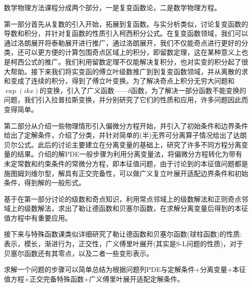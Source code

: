 数学物理方法课程分成两个部分，一是复变函数论，二是数学物理方程。
\setlength{\parindent}{2em}

第一部分首先从复数的引入开始，拓展到复函数。与实分析类似，讨论复变函数的导数和积分，并针对复函数的性质引入柯西积分公式。​在复变函数领域，我们可以通过洛朗展开将泰勒展开进行推广，通过洛朗展开，我们不仅能奇点进行更好的分类，还可以更方便的计算包围奇点区域上的积分，即留数定理，这在某种意义上也是柯西公式的推广。我们利用留数定理不仅能解决复积分，也对实变的积分起了很大帮助。接下来我们将实变函的傅立叶级数推广到到复变函数领域，并从离散的求和变成了连续的积分，得到了傅立叶变换。为了解决奇点上积分无穷大问题和$\exp(ikx)$的变换，引入了广义函数——$\delta$函数，为了解决一部分函数不能变换的问题，我们引入拉普拉斯变换，并分别研究了它们的性质和应用，许多问题因此而变得简单。

第二部分从介绍一些物理情形引入偏微分方程开始，并引入了初始条件和边界条件给出了定解条件，介绍了分类，并针对简单的(半)无界可分离算子情况给出了达朗贝尔公式。此后的讨论主要建立在分离变量的基础上，研究了许多不同方程分离变量的结果。介绍的解PDE一般步骤为利用分离变量法，将偏微分方程转化为带有未定常数和约束条件的常微分方程，即本征值问题，由于讨论到的本征值问题都是施图姆刘维尔型，解具有正交完备性，可以做广义复立叶展开适配边界条件和初始条件，得到解的一般形式。

基于在第一部分讨论的级数和奇点知识，利用常点邻域上的级数解法和正则奇点邻域上的级数解法，求出了勒让德函数和贝塞尔函数，在求解分离变量后得到的本征值方程中有重要应用。

接下来与特殊函数课类似详细研究了勒让德函数和贝塞尔函数(球柱函数)的性质:表示，模长，渐进行为，正交性，广义傅里叶展开(其实是S-L问题的性质)，对于贝塞尔函数还有其零点，以及二者一些变形表示。

求解一个问题的步骤可以简单总结为根据问题列PDE与定解条件+分离变量+本征值方程+正交完备特殊函数+广义傅里叶展开适配定解条件。

\setlength{\parindent}{0em}